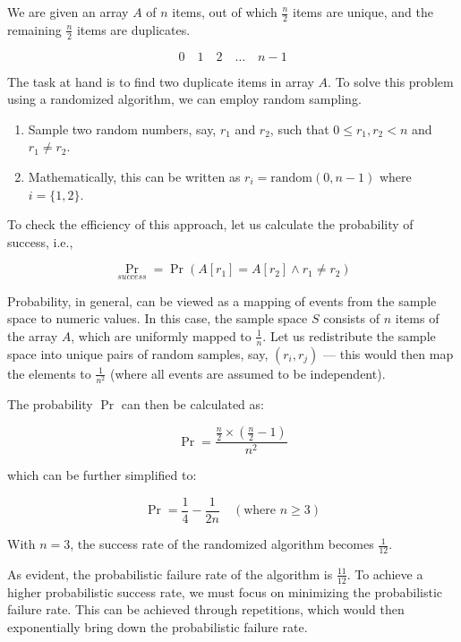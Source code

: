     We are given an array \(A\) of \(n\) items, out of which \(\frac{n}{2}\) items are unique, and the remaining \(\frac{n}{2}\) items are duplicates.
    
    \[
        0 \quad 1 \quad 2 \quad \dots \quad n - 1
    \]
    
    The task at hand is to find two duplicate items in array \(A\). To solve this problem using a randomized algorithm, we can employ random sampling.

    \begin{enumerate}
        \item Sample two random numbers, say, \(r_1\) and \(r_2\), such that \(0 \leq r_1, r_2 < n\) and \(r_1 \neq r_2\).

        \item Mathematically, this can be written as \(r_i = \text{random}(0, n - 1)\) where \(i = \{1, 2\}\).
    \end{enumerate}

    To check the efficiency of this approach, let us calculate the probability of success, i.e.,

    \[
        \Pr_{success} = \Pr(A[r_1] = A[r_2] \land r_1 \neq r_2)
    \]

    Probability, in general, can be viewed as a mapping of events from the sample space to numeric values. In this case, the sample space \(S\) consists of \(n\) items of the array \(A\), which are uniformly mapped to \(\frac{1}{n}\). Let us redistribute the sample space into unique pairs of random samples, say, \((r_i, r_j)\) --- this would then map the elements to \(\frac{1}{n^2}\) (where all events are assumed to be independent).

    The probability $\Pr$ can then be calculated as:

    \[
        \Pr = \frac{\frac{n}{2} \times \left(\frac{n}{2} - 1\right)}{n^2}
    \]

    which can be further simplified to:

    \[
        \Pr = \frac{1}{4} - \frac{1}{2n} \quad (\text{where } n \geq 3)
    \]

    With \(n = 3\), the success rate of the randomized algorithm becomes \(\frac{1}{12}\).

    As evident, the probabilistic failure rate of the algorithm is \(\frac{11}{12}\). To achieve a higher probabilistic success rate, we must focus on minimizing the probabilistic failure rate. This can be achieved through repetitions, which would then exponentially bring down the probabilistic failure rate.


